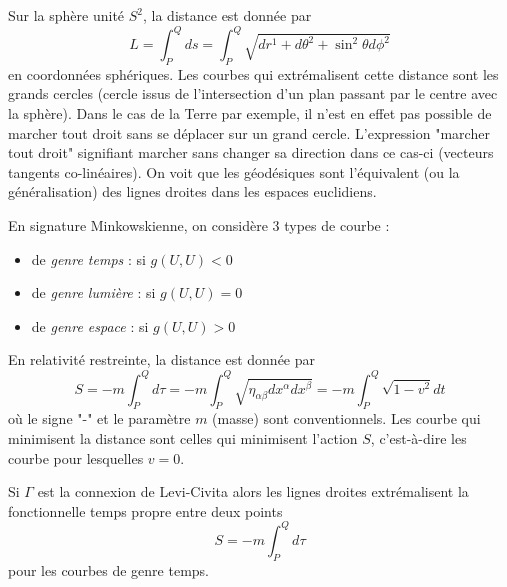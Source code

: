 \documentclass[a4paper,11pt]{report}
\begin{document}
            \begin{exmp}
                Sur la sphère unité $S^2$, la distance est donnée par
                \begin{equation}
                    L = \int_P^Qds = \int_P^Q\sqrt{dr^1+d\theta^2+\sin^2\theta d\phi^2}
                \end{equation}
                en coordonnées sphériques. Les courbes qui extrémalisent cette distance sont les grands cercles (cercle issus de l'intersection d'un plan passant par le centre avec la sphère). Dans le cas de la Terre par exemple, il n'est en effet pas possible de marcher tout droit sans se déplacer sur un grand cercle. L'expression "marcher tout droit" signifiant marcher sans changer sa direction dans ce cas-ci (vecteurs tangents co-linéaires). On voit que les géodésiques sont l'équivalent (ou la généralisation) des lignes droites dans les espaces euclidiens.
            \end{exmp}
            
            \begin{definition}
                En signature Minkowskienne, on considère 3 types de courbe :
                \begin{itemize}[label = \textbullet]
                    \item de \textit{genre temps} : si $g(U,U)<0$
                    \item de \textit{genre lumière} : si $g(U,U)=0$
                    \item de \textit{genre espace} : si $g(U,U)>0$
                \end{itemize}
            \end{definition}
            
            \begin{exmp}
                En relativité restreinte, la distance est donnée par
                \begin{equation}
                    S = -m\int_P^Qd\tau = -m\int_P^Q\sqrt{\eta_{\alpha\beta}dx^\alpha dx^\beta} = -m\int_P^Q\sqrt{1-v^2}dt
                \end{equation}
                où le signe "-" et le paramètre $m$ (masse) sont conventionnels. Les courbe qui minimisent la distance sont celles qui minimisent l'action $S$, c'est-à-dire les courbe pour lesquelles $v=0$.
            \end{exmp}
            
            \begin{thm}\begin{leftbar}
                Si $\Gamma$ est la connexion de Levi-Civita alors les lignes droites extrémalisent  la fonctionnelle temps propre entre deux points
                \begin{equation}
                    S = -m\int_P^Qd\tau
                \end{equation}
                pour les courbes de genre temps.
            \end{leftbar}\end{thm}
            
\end{document}
